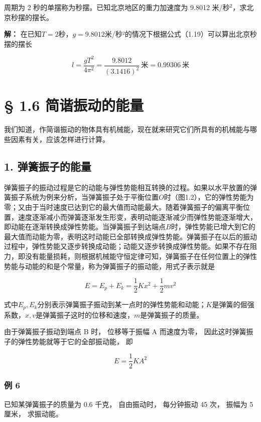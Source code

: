 周期为 2 秒的单摆称为秒摆。已知北京地区的重力加速度为 9.8012
米/秒\(^{2}\)，求北京秒摆的摆长。

\textbf{解：}
在已知\(T = 2\)秒，\(g = 9.8012\)米/秒²的情况下根据公式（1.19）可以算出北京秒摆的摆长

\[
l=\frac{gT^2}{4\pi^2}=\frac{9.8012}{(3.1416)^2}\ \text{米}=0.99306\ \text{米}
\]

\section{§ 1.6
简谐振动的能量}\label{ux7b80ux8c10ux632fux52a8ux7684ux80fdux91cf}

我们知道，作简谐振动的物体具有机械能，现在就来研究它们所具有的机械能与哪些因素有关，应该怎样进行计算。

\subsection{1.
弹簧振子的能量}\label{ux5f39ux7c27ux632fux5b50ux7684ux80fdux91cf}

弹簧振子的振动过程是它的动能与弹性势能相互转换的过程。如果以水平放置的弹簧振子系统为例来分析，当弹簧振子处于平衡位置\(O\)时（图1.2），它的弹性势能为零；又由于当时速度已达到它的最大值而动能最大。随着弹簧振子的偏离平衡位置，速度逐渐减小而弹簧逐渐发生形变，表明动能逐渐减少而弹性势能逐渐增大，即动能在逐渐转换成弹性势能。当弹簧振子到达端点\(B\)时，弹性势能已增大到它的最大值而动能为零，表明这时动能已全部转换成弹性势能。弹簧振子在以后的振动过程中，弹性势能又逐步转换成动能；动能又逐步转换成弹性势能。如果不存在阻力，即没有能量损耗，则根据机械能守恒定律可知，弹簧振子在任何位置上的弹性势能与动能的和是个常量，称为弹簧振子的振动能，用式子表示就是

\[
E=E_p+E_k=\frac12Kx^2+\frac12mv^2
\]

式中\(E_{p}, E_{k}\)分别表示弹簧振子振动到某一点时的弹性势能和动能；\(K\)是弹簧的倔强系数，\(x, v\)是弹簧振子这时的位移和速度，\(m\)是弹簧振子的质量。

由于弹簧振子振动到端点 B 时， 位移等于振幅 A 而速度为零，
因此这时弹簧振子的弹性势能就等于它的全部振动能， 即

\[
E = \frac {1}{2} K A ^ {2} \tag {1.23}
\]

\subsubsection{例 6}\label{ux4f8b-6}

已知某弹簧振子的质量为 0.6 千克， 自由振动时， 每分钟振动 45 次， 振幅为
5 厘米， 求振动能。

